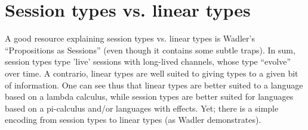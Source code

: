 \documentclass[11pt]{article}
\begin{document}
\section{Session types vs. linear types}

A good resource explaining session types vs. linear types is Wadler's
``Propositions as Sessions'' (even though it contains some subtle
traps). In sum, session types type 'live' sessions with long-lived
channels, whose type ``evolve'' over time. A contrario, linear types
are well suited to giving types to a given bit of information. One can
see thus that linear types are better suited to a language based on a
lambda calculus, while session types are better suited for languages
based on a pi-calculus and/or languages with effects. Yet; there is a
simple encoding from session types to linear types (as Wadler
demonstrates).
\end{document}
